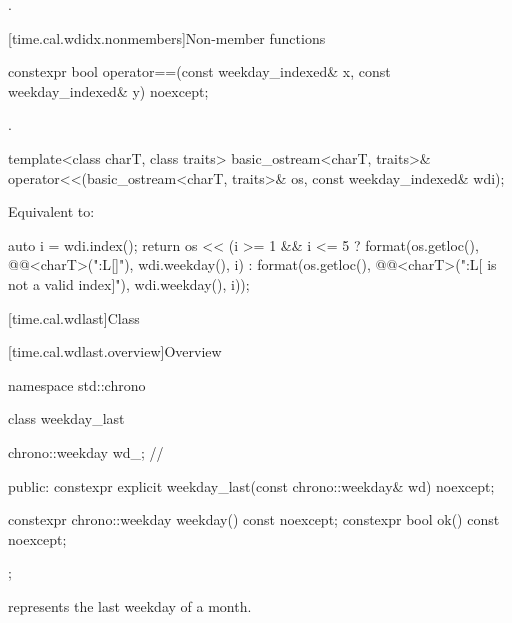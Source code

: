 \begin{itemdescr}
\pnum
\returns
{}.
\end{itemdescr}

[time.cal.wdidx.nonmembers]{Non-member functions}

%
\begin{itemdecl}
constexpr bool operator==(const weekday_indexed& x, const weekday_indexed& y) noexcept;
\end{itemdecl}

\begin{itemdescr}
\pnum
\returns
{}.
\end{itemdescr}

%
\begin{itemdecl}
template<class charT, class traits>
  basic_ostream<charT, traits>&
    operator<<(basic_ostream<charT, traits>& os, const weekday_indexed& wdi);
\end{itemdecl}

\begin{itemdescr}
\pnum
\effects
Equivalent to:
\begin{codeblock}
auto i = wdi.index();
return os << (i >= 1 && i <= 5 ?
  format(os.getloc(), @@<charT>("{:L}[{}]"), wdi.weekday(), i) :
  format(os.getloc(), @@<charT>("{:L}[{} is not a valid index]"),
         wdi.weekday(), i));
\end{codeblock}
\end{itemdescr}

[time.cal.wdlast]{Class }

[time.cal.wdlast.overview]{Overview}

\begin{codeblock}
namespace std::chrono {
  class weekday_last {
    chrono::weekday wd_;                // \expos

  public:
    constexpr explicit weekday_last(const chrono::weekday& wd) noexcept;

    constexpr chrono::weekday weekday() const noexcept;
    constexpr bool ok() const noexcept;
  };
}
\end{codeblock}

\pnum
{} represents the last weekday of a month.

